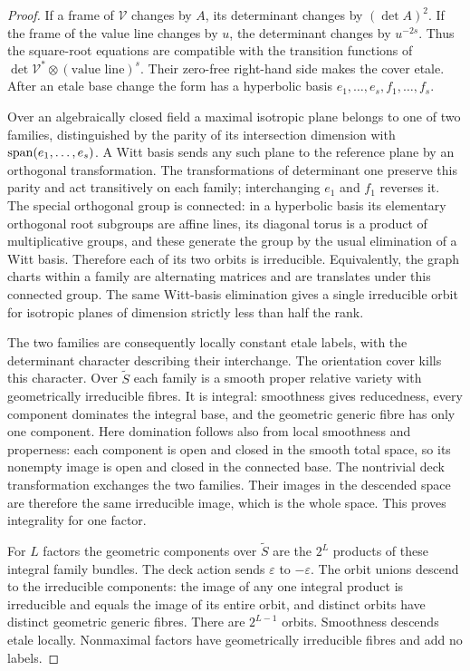 \begin{proof}
If a frame of $\mathcal V$ changes by $A$, its determinant changes
by $(\det A)^2$. If the frame of the value line changes by $u$,
the determinant changes by $u^{-2s}$. Thus the square-root equations
are compatible with the transition functions of
$\det\mathcal V^*\otimes(\text{value line})^s$. Their zero-free
right-hand side makes the cover etale. After an etale base change the
form has a hyperbolic basis $e_1,\ldots,e_s,f_1,\ldots,f_s$.

Over an algebraically closed field a maximal isotropic plane belongs
to one of two families, distinguished by the parity of its intersection
dimension with $\operatorname{span}(e_1,\ldots,e_s)$. A Witt basis sends any such
plane to the reference plane by an orthogonal transformation. The
transformations of determinant one preserve this parity and act
transitively on each family; interchanging $e_1$ and $f_1$ reverses it.
The special orthogonal group is connected: in a hyperbolic basis its
elementary orthogonal root subgroups are affine lines, its diagonal
torus is a product of multiplicative groups, and these generate the
group by the usual elimination of a Witt basis. Therefore each of its
two orbits is irreducible. Equivalently, the graph charts within a
family are alternating matrices and are translates under this
connected group. The same Witt-basis elimination gives a single
irreducible orbit for isotropic planes of dimension strictly less
than half the rank.

The two families are consequently locally constant etale labels,
with the determinant character describing their interchange. The
orientation cover kills this character. Over $\widetilde S$ each
family is a smooth proper relative variety with geometrically
irreducible fibres. It is integral: smoothness gives reducedness,
every component dominates the integral base, and the geometric
generic fibre has only one component. Here domination follows also
from local smoothness and properness: each component is open and
closed in the smooth total space, so its nonempty image is open and
closed in the connected base. The nontrivial deck transformation
exchanges the two families. Their images in the descended space are
therefore the same irreducible image, which is the whole space.
This proves integrality for one factor.

For $L$ factors the geometric components over $\widetilde S$ are the
$2^L$ products of these integral family bundles. The deck action sends
$\varepsilon$ to $-\varepsilon$. The orbit unions descend to the
irreducible components: the image of any one integral product is
irreducible and equals the image of its entire orbit, and distinct
orbits have distinct geometric generic fibres. There are $2^{L-1}$
orbits. Smoothness descends etale locally. Nonmaximal factors have
geometrically irreducible fibres and add no labels.
\end{proof}

